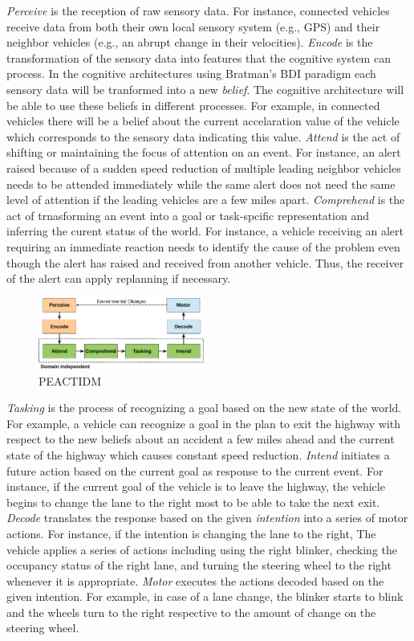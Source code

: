 \documentclass[journal, 11pt]{IEEEtran}
\begin{document}
\textit{Perceive} is the reception of raw sensory data. For instance, connected
vehicles receive data from both their own local sensory system (e.g., GPS) and
their neighbor vehicles (e.g., an abrupt change in their velocities).
\textit{Encode} is the transformation of the sensory data into features that the
cognitive system can process. In the cognitive architectures using Bratman's BDI
paradigm \cite{bratman:intentions-plans} each sensory data will be tranformed
into a new \textit{belief}. The cognitive architecture will be able to use these
beliefs in different processes. For example, in connected vehicles there will be
a belief about the current accelaration value of the vehicle which corresponds
to the sensory data indicating this value. \textit{Attend} is the act of
shifting or maintaining the focus of attention on an event. For instance, an
alert raised because of a sudden speed reduction of multiple leading neighbor
vehicles needs to be attended immediately while the same alert does not need the
same level of attention if the leading vehicles are a few miles apart.
\textit{Comprehend} is the act of trnasforming an event into a goal or
task-spcific representation and inferring the curent status of the world. For
instance, a vehicle receiving an alert requiring an immediate reaction needs to
identify the cause of the problem even though the alert has raised and received
from another vehicle. Thus, the receiver of the alert can apply replanning if
necessary.

\begin{figure}[tbh]
  \centering
  \includegraphics[width=0.485\textwidth]{figs/peactidm-croped.pdf}
  \caption{{\fontsize{10}{10}\selectfont PEACTIDM}}
  \label{fig:peactidm}
\end{figure}

\textit{Tasking} is the process of recognizing a goal based on the new state of
the world. For example, a vehicle can recognize a goal in the plan to exit the
highway with respect to the new beliefs about an accident a few miles ahead and
the current state of the highway which causes constant speed reduction.
\textit{Intend} initiates a future action based on the current goal as response
to the current event. For instance, if the current goal of the vehicle is to
leave the highway, the vehicle begins to change the lane to the right most to be
able to take the next exit. \textit{Decode} translates the response based on the
given \textit{intention} into a series of motor actions. For instance, if the
intention is changing the lane to the right, The vehicle applies a series of
actions including using the right blinker, checking the occupancy status of the
right lane, and turning the steering wheel to the right whenever it is
appropriate. \textit{Motor} executes the actions decoded based on the given
intention. For example, in case of a lane change, the blinker starts to blink
and the wheels turn to the right respective to the amount of change on the
steering wheel.
\end{document}
